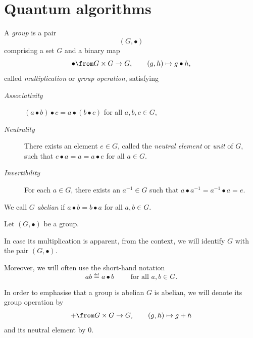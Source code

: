 \documentclass[a4paper,oneside, 12pt]{amsart}
\begin{document}
\section{Quantum algorithms}\label{sec:quantum-algorithms}

\begin{definition}\label{def:group}
  A \emph{group} is a pair
  \begin{equation*}
    (G, \bullet)
  \end{equation*}
  comprising a set \( G \)  and a binary map
  \begin{equation*}
    \bullet \from G \times G \to G, \qquad (g,h) \mapsto  g\bullet h,
  \end{equation*}
  called \emph{multiplication} or \emph{group operation}, satisfying
  \begin{description}
    \item[\emph{Associativity}] \((a \bullet b) \bullet c = a \bullet (b \bullet c)\) for all \( a, b, c \in G \),
    \item[\emph{Neutrality}] There exists an element \( e \in G \), called the \emph{neutral element} or \emph{unit} of \(G\), such that \( e \bullet a = a = a \bullet e \) for all \( a \in G \).
    \item[\emph{Invertibility}] For each \( a \in G \), there exists an \( a^{-1} \in G \) such that \( a \bullet a^{-1} = a^{-1} \bullet a = e \).
  \end{description}
  We call \(G\) \emph{abelian} if  \( a\bullet b = b \bullet a \) for all \(a, b\in G\).
\end{definition}

\begin{notation}
  Let \((G, \bullet)\) be a group.
  \begin{thmlist}
    \item In case its multiplication is apparent, from the context, we will identify \(G\) with the pair \((G, \bullet)\).
    \item Moreover, we will often use the short-hand notation
    \begin{equation*}
      ab \eqdef a \bullet b \qquad \text{ for all } a, b \in G.
    \end{equation*}
    \item In order to emphasise that a group is abelian \(G\) is abelian, we will denote its group operation by
    \begin{equation*}
      + \from G \times G \to G, \qquad (g,h) \mapsto g + h
    \end{equation*}
    and its neutral element by \(0\).
  \end{thmlist}
\end{notation}
\end{document}
